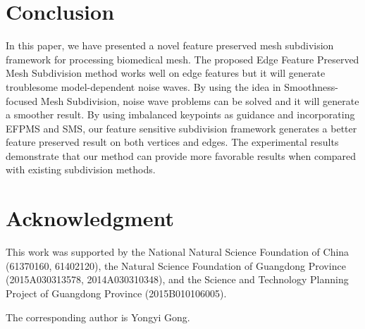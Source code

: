 \documentclass[10pt, conference, compsocconf]{IEEEtran}
\begin{document}


\section{Conclusion}\label{Section:Conclusion}
In this paper, we have presented a novel feature preserved mesh subdivision framework for processing biomedical mesh. The proposed Edge Feature Preserved Mesh Subdivision method works well on edge features but it will generate troublesome model-dependent noise waves. By using the idea in Smoothness-focused Mesh Subdivision, noise wave problems can be solved and it will generate a smoother result. By using imbalanced keypoints as guidance and incorporating EFPMS and SMS, our feature sensitive subdivision framework generates a better feature preserved result on both vertices and edges. The experimental results demonstrate that our method can provide more favorable results when compared with existing subdivision methods.



\section*{Acknowledgment}

This work was supported by the National Natural Science Foundation of China (61370160, 61402120), the Natural Science Foundation of Guangdong Province (2015A030313578, 2014A030310348), and the Science and Technology Planning Project of Guangdong Province (2015B010106005).

The corresponding author is Yongyi Gong.





%

%




\end{document}
